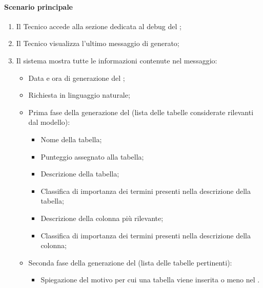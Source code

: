 \paragraph*{Scenario principale}
\begin{enumerate}
  \item Il Tecnico accede alla sezione dedicata al debug del ;
  \item Il Tecnico visualizza l'ultimo messaggio di  generato;
  \item Il sistema mostra tutte le informazioni contenute nel messaggio:
    \begin{itemize}
      \item Data e ora di generazione del ;
      \item Richiesta in linguaggio naturale;
      \item Prima fase della generazione del  (lista delle tabelle considerate rilevanti dal modello):
      \begin{itemize}
        \item Nome della tabella;
        \item Punteggio assegnato alla tabella;
        \item Descrizione della tabella;
        \item Classifica di importanza dei termini presenti nella descrizione della tabella;
        \item Descrizione della colonna più rilevante;
        \item Classifica di importanza dei termini presenti nella descrizione della colonna;
      \end{itemize}
      \item Seconda fase della generazione del  (lista delle tabelle pertinenti):
      \begin{itemize}
        \item Spiegazione del motivo per cui una tabella viene inserita o meno nel .
      \end{itemize}
    \end{itemize}
\end{enumerate}